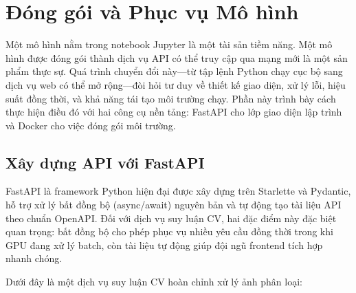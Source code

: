 \section{Đóng gói và Phục vụ Mô hình}
\label{sec:model_serving}

Một mô hình nằm trong notebook Jupyter là một tài sản tiềm năng. Một mô hình được đóng gói thành dịch vụ API có thể truy cập qua mạng mới là một sản phẩm thực sự. Quá trình chuyển đổi này---từ tập lệnh Python chạy cục bộ sang dịch vụ web có thể mở rộng---đòi hỏi tư duy về thiết kế giao diện, xử lý lỗi, hiệu suất đồng thời, và khả năng tái tạo môi trường chạy. Phần này trình bày cách thực hiện điều đó với hai công cụ nền tảng: FastAPI cho lớp giao diện lập trình và Docker cho việc đóng gói môi trường.

\subsection{Xây dựng API với FastAPI}
\label{subsec:fastapi}

FastAPI là framework Python hiện đại được xây dựng trên Starlette và Pydantic, hỗ trợ xử lý bất đồng bộ (async/await) nguyên bản và tự động tạo tài liệu API theo chuẩn OpenAPI. Đối với dịch vụ suy luận CV, hai đặc điểm này đặc biệt quan trọng: bất đồng bộ cho phép phục vụ nhiều yêu cầu đồng thời trong khi GPU đang xử lý batch, còn tài liệu tự động giúp đội ngũ frontend tích hợp nhanh chóng.

Dưới đây là một dịch vụ suy luận CV hoàn chỉnh xử lý ảnh phân loại:

